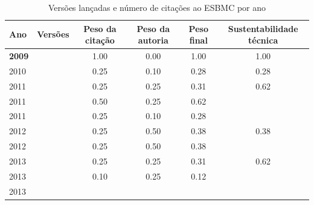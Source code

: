 \begin{table}[H]
\caption{Versões lançadas e número de citações ao ESBMC por ano}
\centering
\begin{tabular}{| l | c | c | c | c | c |}
  \hline
  Ano & Versões & Peso da citação & Peso da autoria & Peso final & Sustentabilidade técnica \\
  \hline
            {\bf 2009}
          &
          
          &
          1.00
          &
          0.00
          &
          1.00
          &
            {\color{blue} 1.00}
          \\
\hline
            2010
          &
          
          &
          0.25
          &
          0.10
          &
          0.28
          &
            {\color{red} 0.28}
          \\
\hline
            2011
          &
          
          &
          0.25
          &
          0.25
          &
          0.31
          &
            {\color{blue} 0.62}
          \\
            2011
          &
          
          &
          0.50
          &
          0.25
          &
          0.62
          &
          \\
            2011
          &
          
          &
          0.25
          &
          0.10
          &
          0.28
          &
          \\
\hline
            2012
          &
          
          &
          0.25
          &
          0.50
          &
          0.38
          &
            {\color{red} 0.38}
          \\
            2012
          &
          
          &
          0.25
          &
          0.50
          &
          0.38
          &
          \\
\hline
            2013
          &
          
          &
          0.25
          &
          0.25
          &
          0.31
          &
            {\color{blue} 0.62}
          \\
            2013
          &
          
          &
          0.10
          &
          0.25
          &
          0.12
          &
          \\
            2013
          &
          

\end{tabular}
\end{table}
